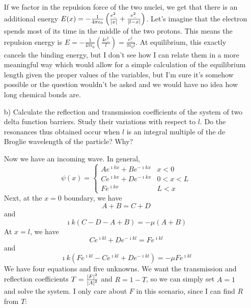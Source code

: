 \documentclass[a4paper,twoside]{article}
\begin{document}
\begin{itemize}
\begin{problem}
        If we factor in the repulsion force of the two nuclei, we get that there is an additional energy $ E(x) = -\frac{1}{4 \pi \epsilon_0} \left( \frac{e_-^2}{\abs{x}} + \frac{e_-^2}{\abs{l-x}} \right) $. Let's imagine that the electron spends most of its time in the middle of the two protons. This means the repulsion energy is $E = - \frac{1}{4 \pi \epsilon_0} \left( \frac{4 e_-^2}{l} \right) = \frac{e_-^2}{\pi \epsilon_0 l} $. At equilibrium, this exactly cancels the binding energy, but I don't see how I can relate them in a more meaningful way which would allow for a simple calculation of the equilibrium length given the proper values of the variables, but I'm sure it's somehow possible or the question wouldn't be asked and we would have no idea how long chemical bonds are.
    \end{problem}
\item[b)] Calculate the reflection and transmission coefficients of the system of two delta function barriers. Study their variations with respect to $ l $. Do the resonances thus obtained occur when $ l $ is an integral multiple of the de Broglie wavelength of the particle? Why?
\begin{problem}
    Now we have an incoming wave. In general,
    \begin{equation}
        \psi(x) =
        \begin{cases}
            A e^{\imath kx} + B e^{-\imath kx} & x<0\\
            C e^{\imath kx} + D e^{-\imath kx} & 0 < x < L\\
            F e^{\imath kx} & L < x
        \end{cases}
    \end{equation}
    Next, at the $ x = 0 $ boundary, we have
    \begin{equation}
        A + B = C + D
    \end{equation}
    and
    \begin{equation}
        \imath k(C - D - A + B) = -\mu(A + B)
    \end{equation}
    At $ x = l $, we have
    \begin{equation}
        C e^{\imath k l} + D e^{-\imath k l} = F e^{\imath k l}
    \end{equation}
    and
    \begin{equation}
        \imath k(F e^{\imath kl} - C e^{\imath kl} + D e^{-\imath kl}) = -\mu F e^{\imath kl}
    \end{equation}
    We have four equations and five unknowns. We want the transmission and reflection coefficients $ T = \frac{\abs{F}^2}{\abs{A}^2} $ and $ R = 1-T $, so we can simply set $ A = 1 $ and solve the system. I only care about $ F $ in this scenario, since I can find $ R $ from $ T $:

\end{problem}
\end{itemize}
\end{document}

